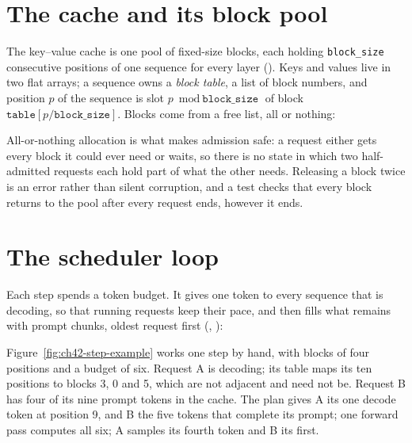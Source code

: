 
\section{The cache and its block pool}

The key--value cache is one pool of fixed-size blocks, each holding
\texttt{block\_size} consecutive positions of one sequence for every layer
(). Keys and values live in two flat arrays; a sequence owns a
\emph{block table}, a list of block numbers, and position $p$ of the sequence is
slot $p \bmod \texttt{block\_size}$ of block $\texttt{table}[p / \texttt{block\_size}]$.
Blocks come from a free list, all or nothing:


All-or-nothing allocation is what makes admission safe: a request either gets
every block it could ever need or waits, so there is no state in which two
half-admitted requests each hold part of what the other needs. Releasing a block
twice is an error rather than silent corruption, and a test checks that every
block returns to the pool after every request ends, however it ends.

\section{The scheduler loop}

Each step spends a token budget. It gives one token to every sequence that is
decoding, so that running requests keep their pace, and then fills what remains
with prompt chunks, oldest request first (,
):


Figure~\ref{fig:ch42-step-example} works one step by hand, with blocks of four
positions and a budget of six. Request A is decoding; its table maps its ten
positions to blocks 3, 0 and 5, which are not adjacent and need not be. Request
B has four of its nine prompt tokens in the cache. The plan gives A its one
decode token at position 9, and B the five tokens that complete its prompt;
one forward pass computes all six; A samples its fourth token and B its first.


